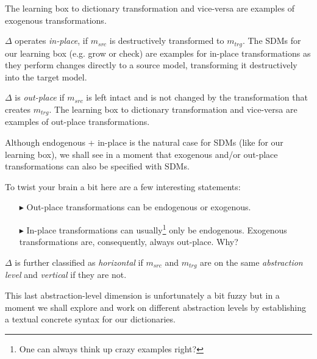 The learning box to dictionary transformation and vice-versa are examples of exogenous transformations.

$\Delta$ operates \emph{in-place}, if $m_{src}$ is destructively transformed to $m_{trg}$.
The SDMs for our learning box (e.g. grow or check) are examples for in-place transformations as they perform changes directly to a source model, transforming it destructively into the target model.


$\Delta$ is \emph{out-place} if $m_{src}$ is left intact and is not changed by the transformation that creates $m_{trg}$.
The learning box to dictionary transformation and vice-versa are examples of out-place transformations.

Although endogenous + in-place is the natural case for SDMs (like for our learning box), we shall see in a moment that exogenous and/or out-place transformations can also be specified with SDMs.

 
To twist your brain a bit here are a few interesting statements:
\begin{enumerate}
\item[$\blacktriangleright$] Out-place transformations can be endogenous or exogenous.

\item[$\blacktriangleright$] In-place transformations can usually\footnote{One can always think up crazy examples right?} only be endogenous.  Exogenous transformations are, consequently, always out-place.  Why? 
\end{enumerate}  

   
$\Delta$ is further classified as \emph{horizontal} if $m_{src}$ and $m_{trg}$ are on the same \emph{abstraction level} and \emph{vertical} if they are not. 

This last abstraction-level dimension is unfortunately a bit fuzzy but in a moment we shall explore and work on 
different abstraction levels by establishing a textual concrete syntax for our dictionaries.


